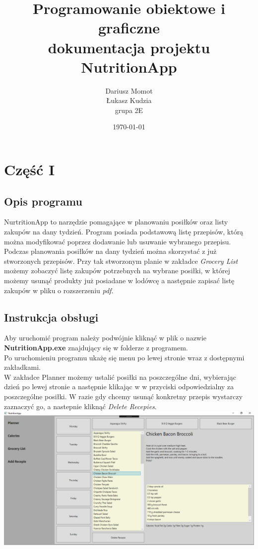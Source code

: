 \documentclass[12pt,a4paper]{article}
\begin{document}
	
	\title{Programowanie obiektowe i graficzne\\\small{dokumentacja projektu NutritionApp}}
	\author{Dariusz Momot \\ Łukasz Kudzia \\ grupa 2E}
	\date{\today}

	\maketitle
	\newpage
	\section*{Część I}
	\subsection*{Opis programu}
	NurtritionApp to narzędzie pomagające w planowaniu posiłków oraz listy zakupów na dany tydzień.
	Program posiada podstawową listę przepisów, którą można modyfikować poprzez dodawanie lub usuwanie wybranego przepisu.
	Podczas planowania posiłków na dany tydzień można skorzystać z już stworzonych przepisów.
	Przy tak stworzonym planie w zakładce \textit{Grocery List} możemy zobaczyć listę zakupów potrzebnych na wybrane posiłki,
	w której możemy usunąć produkty już posiadane w lodówcę a następnie zapisać listę zakupów w pliku o rozszerzeniu \textit{pdf}.
	
	\subsection*{Instrukcja obsługi}
	Aby uruchomić program należy podwójnie kliknąć w plik o nazwie \textbf{NutritionApp.exe} znajdujący się w folderze 
	z programem. \\Po uruchomieniu programu ukażę się menu po lewej stronie wraz z dostępnymi zakładkami. \\
	W zakładce Planner możemy ustalić posiłki na poszczególne dni, wybierając dzień po lewej stronie a następnie klikając w 
	w przyciski odpowiedzialny za poszczególne posiłki. W razie gdy chcemy usunąć konkretny przepis wystarczy zaznaczyć go, a 
	nastepnie kliknąć \textit{Delete Recepies}. \\
	\includegraphics[scale = 0.5]{img/Planner.png} 
	\newpage
	
\end{document}
